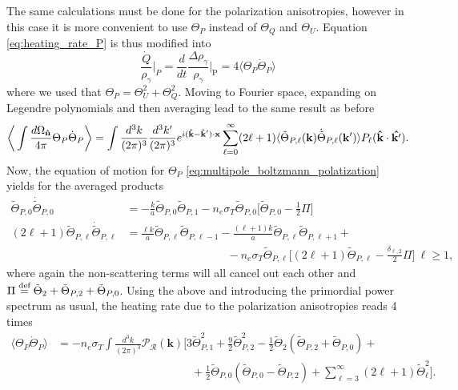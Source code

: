 The same calculations must be done for the polarization anisotropies, however in this case it is more convenient to use $\Theta_P$ instead of $\Theta_Q$ and $\Theta_U$. Equation \eqref{eq:heating_rate_P} is thus modified into $$\frac{\dot Q}{\rho_\gamma}\bigg|_P=\frac{d}{dt}\frac{\Delta \rho_\gamma}{\rho_\gamma}\bigg|_\text{P}=4\langle\Theta_P\dot \Theta_P\rangle$$
where we used that $\Theta_P=\Theta_U^2+\Theta_Q^2$. Moving to Fourier space, expanding on Legendre polynomials and then averaging lead to the same result as before 
\begin{align*}
    \bigg\langle\int\frac{d\Omega_{\mathbf{\hat{n}}}}{4\pi}\Theta_P\dot \Theta_P\bigg\rangle=\int\frac{d^3k}{(2\pi)^3}\frac{d^3k'}{(2\pi)^3}e^{i(\mathbf{\hat{k}}-\mathbf{\hat{k}}')\cdot\mathbf{x}}\sum_{\ell=0}^{\infty}(2\ell+1)\langle\tilde\Theta_{P,\ell}(\mathbf{k})\dot{\tilde\Theta}_{P,\ell}(\mathbf{k}')\rangle P_\ell(\mathbf{\hat{k}}\cdot\mathbf{\hat{k'}}).
\end{align*}
Now, the equation of motion for $\Theta_P$ \eqref{eq:multipole_boltzmann_polatization} yields for the averaged products
\begin{align*}
    \tilde{\Theta}_{P,0}\dot{\tilde{\Theta}}_{P,0}&=-\frac{k}{a}\tilde{\Theta}_{P,0}\tilde{\Theta}_{P,1}-n_e\sigma_T\tilde{\Theta}_{P,0}\bigg[\tilde\Theta_{P,0}-\frac{1}{2}\Pi\bigg]\\
     (2\ell+1)\tilde{\Theta}_{P,\ell}\dot{\tilde{\Theta}}_{P,\ell}&=\frac{\ell k}{a}\tilde{\Theta}_{P,\ell}\tilde\Theta_{P,\ell-1}-\frac{(\ell+1)k}{a}\tilde{\Theta}_{P,\ell}\tilde\Theta_{P,\ell+1}+\\&\qquad\quad\qquad\qquad\qquad-n_e\sigma_T\tilde{\Theta}_{P,\ell}\bigg[(2\ell+1)\tilde\Theta_{P,\ell}-\frac{\delta_{\ell,2}}{2}\Pi\bigg]\ \ell\geq 1,
 \end{align*}
where again the non-scattering terms will all cancel out each other and $\Pi\stackrel{\text{def}}{=}\tilde\Theta_2+\tilde\Theta_{P,2}+\tilde\Theta_{P,0}$. Using the above and introducing the primordial power spectrum as usual, the heating rate due to the polarization anisotropies reads 4 times
\begin{align}
    \langle\Theta_P\dot \Theta_P\rangle&=-n_e\sigma_T\int\frac{d^3k}{(2\pi)^3}\mathcal{P}_\mathcal{R} (\mathbf{k})\bigg[3\tilde\Theta_{P,1}^2+\frac{9}{2}\tilde\Theta_{P,2}^2-\frac{1}{2}\tilde\Theta_2(\tilde\Theta_{P,2}+\tilde\Theta_{P,0})+\nonumber\\&\qquad\qquad\qquad\qquad\qquad\qquad+\frac{1}{2}\tilde\Theta_{P,0}(\tilde\Theta_{P,0}-\tilde\Theta_{P,2})+\sum_{\ell=3}^{\infty}(2\ell+1)\tilde\Theta_\ell^2\bigg].
    \label{eq:TT_P_average_scalar}
\end{align}


